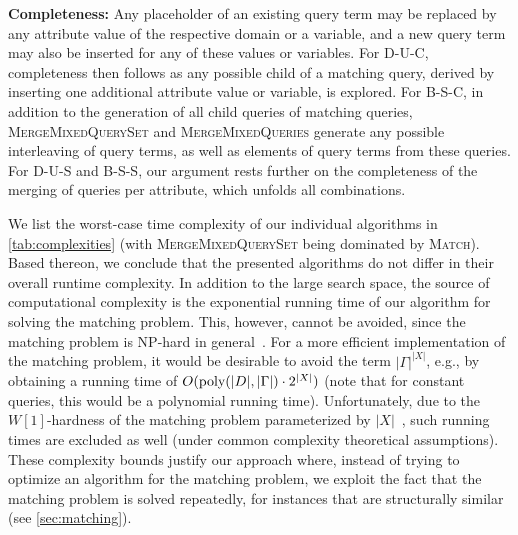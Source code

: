 \textbf{Completeness:}
 Any placeholder
of an existing query term may be replaced by any attribute value of the
respective domain or a variable, and a new query
term may also be inserted for any of these values or variables.
For D-U-C, completeness then follows as any possible child
of a matching query, derived by inserting one additional attribute value or
variable,
is explored. For B-S-C, in addition to the generation of all child queries
of matching queries, \textsc{MergeMixedQuerySet}
and \textsc{MergeMixedQueries} generate any possible interleaving of query
terms, as well as elements of query terms from these queries. For D-U-S and
B-S-S, our argument rests further on the completeness of
the merging of queries per attribute, which unfolds all combinations.


We list the worst-case time complexity of our individual
algorithms in \autoref{tab:complexities} (with \textsc{MergeMixedQuerySet}
being dominated by \textsc{Match}). Based thereon, we conclude that the
presented algorithms do not differ in their overall runtime complexity.
In addition to the large search space, the source of computational
complexity is the exponential running time of our algorithm for solving the
matching problem.
This, however, cannot be
avoided, since the matching problem is NP-hard in general~\cite{icdt2022}.
For a more efficient
implementation of the matching problem, it would be desirable to avoid
the term $|\Gamma|^{|X|}$, e.g., by obtaining a running time
of $O(\operatorname{\textup{poly}}(|D|, |\Gamma|) \cdot 2^{|X|})$ (note that for
constant queries, this would be a polynomial running time). Unfortunately,
due to the $W[1]$-hardness of the matching problem parameterized by
$|X|$~\cite{icdt2022}, such running times are excluded as well (under common
complexity theoretical assumptions).
These complexity bounds justify our approach where, instead of trying
to optimize an algorithm for the matching problem, we exploit
the fact that the matching problem is solved repeatedly, for
instances that are structurally similar (see \autoref{sec:matching}).




